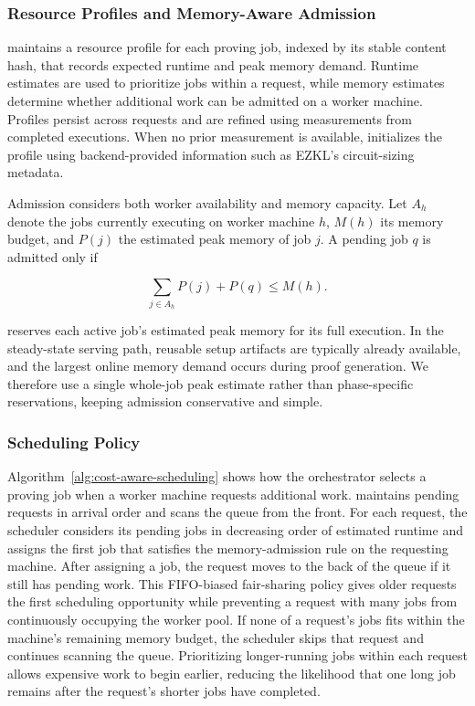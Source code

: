 \subsubsection{Resource Profiles and Memory-Aware Admission}

\TITLE{} maintains a resource profile for each proving job, indexed by its stable content hash, that records expected runtime and peak memory demand. Runtime estimates are used to prioritize jobs within a request, while memory estimates determine whether additional work can be admitted on a worker machine. Profiles persist across requests and are refined using measurements from completed executions. When no prior measurement is available, \TITLE{} initializes the profile using backend-provided information such as EZKL's circuit-sizing metadata.

Admission considers both worker availability and memory capacity. Let \(A_h\) denote the jobs currently executing on worker machine \(h\), \(M(h)\) its memory budget, and \(P(j)\) the estimated peak memory of job \(j\). A pending job \(q\) is admitted only if

\[
    \sum_{j \in A_h} P(j) + P(q) \leq M(h).
\]

\TITLE{} reserves each active job's estimated peak memory for its full execution. In the steady-state serving path, reusable setup artifacts are typically already available, and the largest online memory demand occurs during proof generation. We therefore use a single whole-job peak estimate rather than phase-specific reservations, keeping admission conservative and simple.


\subsubsection{\textbf{Scheduling Policy}}

Algorithm~\ref{alg:cost-aware-scheduling} shows how the orchestrator selects a proving job when a worker machine requests additional work. \TITLE{} maintains pending requests in arrival order and scans the queue from the front. For each request, the scheduler considers its pending jobs in decreasing order of estimated runtime and assigns the first job that satisfies the memory-admission rule on the requesting machine. After assigning a job, the request moves to the back of the queue if it still has pending work. This FIFO-biased fair-sharing policy gives older requests the first scheduling opportunity while preventing a request with many jobs from continuously occupying the worker pool. If none of a request's jobs fits within the machine's remaining memory budget, the scheduler skips that request and continues scanning the queue. Prioritizing longer-running jobs within each request allows expensive work to begin earlier, reducing the likelihood that one long job remains after the request's shorter jobs have completed.


